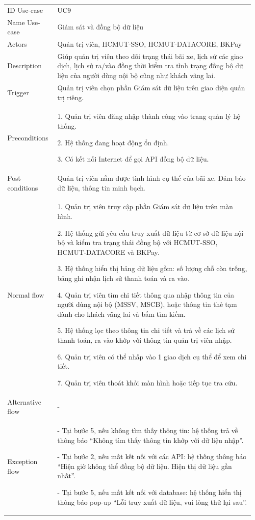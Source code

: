 \begin{center}
    \begin{tabular}{|m{2.5cm}|m{13cm}|}
    \hline
        ID Use-case  & UC9 \\ 
        Name Use-case & Giám sát và đồng bộ dữ liệu \\ 
    \hline
        Actors & Quản trị viên, HCMUT-SSO, HCMUT-DATACORE, BKPay \\
    \hline
        Description & Giúp quản trị viên theo dõi trạng thái bãi xe, lịch sử các giao dịch, lịch sử ra/vào đồng thời kiểm tra tình trạng đồng bộ dữ liệu của người dùng nội bộ cũng như khách vãng lai. \\
    \hline
        Trigger & Quản trị viên chọn phần Giám sát dữ liệu trên giao diện quản trị riêng. \\
    \hline
        Preconditions & 
        1. Quản trị viên đăng nhập thành công vào trang quản lý hệ thống.
        
        2. Hệ thống đang hoạt động ổn định.
        
        3. Có kết nối Internet để gọi API đồng bộ dữ liệu. \\
    \hline
        Post conditions & Quản trị viên nắm được tình hình cụ thể của bãi xe. Đảm bảo dữ liệu, thông tin minh bạch. \\
    \hline
        Normal flow & 
        1. Quản trị viên truy cập phần Giám sát dữ liệu trên màn hình.
        
        2. Hệ thống gửi yêu cầu truy xuất dữ liệu từ cơ sở dữ liệu nội bộ và kiểm tra trạng thái đồng bộ với HCMUT-SSO, HCMUT-DATACORE và BKPay.
        
        3. Hệ thống hiển thị bảng dữ liệu gồm: số lượng chỗ còn trống, bảng ghi nhận lịch sử thanh toán và ra vào.
        
        4. Quản trị viên tìm chi tiết thông qua nhập thông tin của người dùng nội bộ (MSSV, MSCB), hoặc thông tin thẻ tạm dành cho khách vãng lai và bấm tìm kiếm.
        
        5. Hệ thống lọc theo thông tin chi tiết và trả về các lịch sử thanh toán, ra vào khớp với thông tin quản trị viên nhập.
        
        6. Quản trị viên có thể nhấp vào 1 giao dịch cụ thể để xem chi tiết.
        
        7. Quản trị viên thoát khỏi màn hình hoặc tiếp tục tra cứu. \\
    \hline
        Alternative flow & - \\ 
    \hline
        Exception flow & 
        - Tại bước 5, nếu không tìm thấy thông tin: hệ thống trả về thông báo “Không tìm thấy thông tin khớp với dữ liệu nhập”.
        
        - Tại bước 2, nếu mất kết nối với các API: hệ thống thông báo “Hiện giờ không thể đồng bộ dữ liệu. Hiện thị dữ liệu gần nhất”.
        
        - Tại bước 5, nếu mất kết nối với database: hệ thống hiển thị thông báo pop-up “Lỗi truy xuất dữ liệu, vui lòng thử lại sau”. \\
    \hline
    \end{tabular}
\end{center}